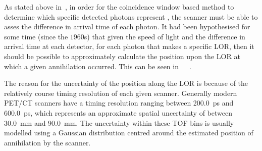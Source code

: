                 As stated above in~, in order for the coincidence window based method to determine which specific detected photons represent , the scanner must be able to asses the difference in arrival time of each photon. %
                It had been hypothesised for some time (since the $1960$s) that given the speed of light and the difference in arrival time at each detector, for each photon that makes a specific \gls{LOR}, then it should be possible to approximately calculate the position upon the \gls{LOR} at which a given annihilation occurred. %
                This can be seen in~~~.
                
                The reason for the uncertainty of the position along the \gls{LOR} is because of the relatively course timing resolution of each given scanner. Generally modern \gls{PET}/\gls{CT} scanners have a timing resolution ranging between \SI{200.0}{\pico\second} and \SI{600.0}{\pico\second}, which represents an approximate spatial uncertainty of between \SI{30.0}{\milli\metre} and \SI{90.0}{\milli\metre}. %
                The uncertainty within these \gls{TOF} bins is usually modelled using a Gaussian distribution centred around the estimated position of annihilation by the scanner.
                
                
